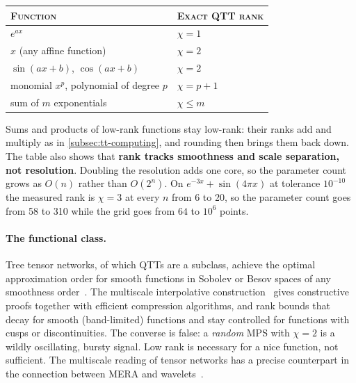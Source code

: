\begin{center}
  \begin{tabular}{@{}ll@{}}
    \toprule
    \textsc{Function} & \textsc{Exact QTT rank} \\
    \midrule
    $e^{ax}$                        & $\chi = 1$ \\
    $x$ (any affine function)       & $\chi = 2$ \\
    $\sin(ax+b)$, $\cos(ax+b)$      & $\chi = 2$ \\
    monomial $x^p$, polynomial of degree $p$ & $\chi = p+1$ \\
    sum of $m$ exponentials         & $\chi \le m$ \\
    \bottomrule
  \end{tabular}
\end{center}

Sums and products of low-rank functions stay low-rank: their ranks add and
multiply as in \cref{subsec:tt-computing}, and rounding then brings them back
down. The table also shows that \textbf{rank tracks smoothness and scale
separation, not resolution}. Doubling the resolution adds one core, so the
parameter count grows as $O(n)$ rather than $O(2^n)$. On
$e^{-3x}+\sin(4\pi x)$ at tolerance $10^{-10}$ the measured rank is $\chi = 3$
at every $n$ from 6 to 20, so the parameter count goes from 58 to 310 while the
grid goes from $64$ to $10^6$ points.

\paragraph{The functional class.}
Tree tensor networks, of which QTTs are a subclass, achieve the optimal
approximation order for smooth functions in Sobolev or Besov spaces of any
smoothness order~\cite{Ali2023,Ali2021}. The multiscale interpolative
construction~\cite{Lindsey2023} gives constructive proofs together with
efficient compression algorithms, and rank bounds that decay for smooth
(band-limited) functions and stay controlled for functions with cusps or
discontinuities. The converse is false: a \emph{random} MPS with $\chi = 2$ is
a wildly oscillating, bursty signal. Low rank is necessary for a nice function,
not sufficient. The multiscale reading of tensor networks has a precise
counterpart in the connection between MERA and wavelets~\cite{Evenbly2016}.

